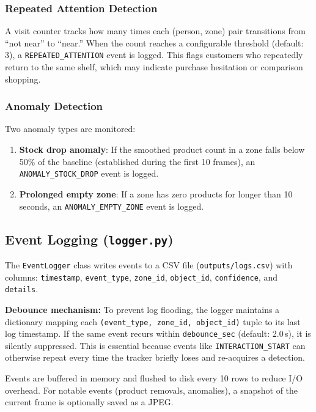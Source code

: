 \documentclass[12pt,a4paper]{article}
\begin{document}
\subsubsection{Repeated Attention Detection}

A visit counter tracks how many times each (person, zone) pair transitions from ``not near'' to ``near.''
When the count reaches a configurable threshold (default: 3), a \texttt{REPEATED\_ATTENTION} event is logged.
This flags customers who repeatedly return to the same shelf, which may indicate purchase hesitation or comparison shopping.

\subsubsection{Anomaly Detection}

Two anomaly types are monitored:
\begin{enumerate}[nosep]
    \item \textbf{Stock drop anomaly}: If the smoothed product count in a zone falls below 50\% of the baseline (established during the first 10 frames), an \texttt{ANOMALY\_STOCK\_DROP} event is logged.
    \item \textbf{Prolonged empty zone}: If a zone has zero products for longer than 10 seconds, an \texttt{ANOMALY\_EMPTY\_ZONE} event is logged.
\end{enumerate}

\subsection{Event Logging (\texttt{logger.py})}

The \texttt{EventLogger} class writes events to a CSV file (\texttt{outputs/logs.csv}) with columns: \texttt{timestamp}, \texttt{event\_type}, \texttt{zone\_id}, \texttt{object\_id}, \texttt{confidence}, and \texttt{details}.

\textbf{Debounce mechanism:} To prevent log flooding, the logger maintains a dictionary mapping each \texttt{(event\_type, zone\_id, object\_id)} tuple to its last log timestamp.
If the same event recurs within \texttt{debounce\_sec} (default: 2.0\,s), it is silently suppressed.
This is essential because events like \texttt{INTERACTION\_START} can otherwise repeat every time the tracker briefly loses and re-acquires a detection.

Events are buffered in memory and flushed to disk every 10 rows to reduce I/O overhead.
For notable events (product removals, anomalies), a snapshot of the current frame is optionally saved as a JPEG.
\end{document}
